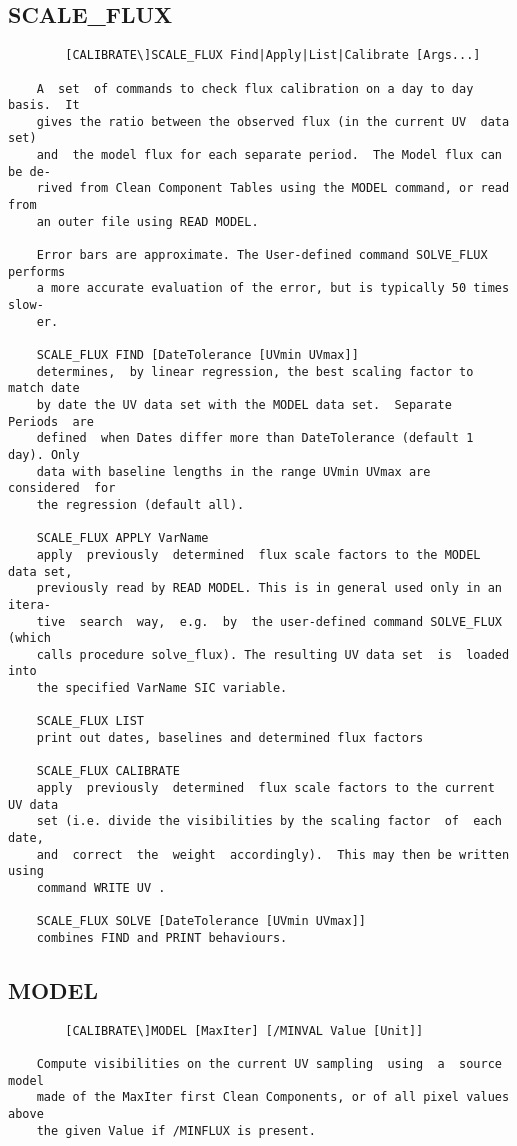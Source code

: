 \subsection{SCALE\_FLUX}
\begin{verbatim}
        [CALIBRATE\]SCALE_FLUX Find|Apply|List|Calibrate [Args...]

    A  set  of commands to check flux calibration on a day to day basis.  It
    gives the ratio between the observed flux (in the current UV  data  set)
    and  the model flux for each separate period.  The Model flux can be de-
    rived from Clean Component Tables using the MODEL command, or read  from
    an outer file using READ MODEL.

    Error bars are approximate. The User-defined command SOLVE_FLUX performs
    a more accurate evaluation of the error, but is typically 50 times slow-
    er.

    SCALE_FLUX FIND [DateTolerance [UVmin UVmax]]
    determines,  by linear regression, the best scaling factor to match date
    by date the UV data set with the MODEL data set.  Separate  Periods  are
    defined  when Dates differ more than DateTolerance (default 1 day). Only
    data with baseline lengths in the range UVmin UVmax are  considered  for
    the regression (default all).

    SCALE_FLUX APPLY VarName
    apply  previously  determined  flux scale factors to the MODEL data set,
    previously read by READ MODEL. This is in general used only in an itera-
    tive  search  way,  e.g.  by  the user-defined command SOLVE_FLUX (which
    calls procedure solve_flux). The resulting UV data set  is  loaded  into
    the specified VarName SIC variable.

    SCALE_FLUX LIST
    print out dates, baselines and determined flux factors

    SCALE_FLUX CALIBRATE
    apply  previously  determined  flux scale factors to the current UV data
    set (i.e. divide the visibilities by the scaling factor  of  each  date,
    and  correct  the  weight  accordingly).  This may then be written using
    command WRITE UV .

    SCALE_FLUX SOLVE [DateTolerance [UVmin UVmax]]
    combines FIND and PRINT behaviours.

\end{verbatim}
\subsection{MODEL}
\begin{verbatim}
        [CALIBRATE\]MODEL [MaxIter] [/MINVAL Value [Unit]]

    Compute visibilities on the current UV sampling  using  a  source  model
    made of the MaxIter first Clean Components, or of all pixel values above
    the given Value if /MINFLUX is present.

\end{verbatim}
